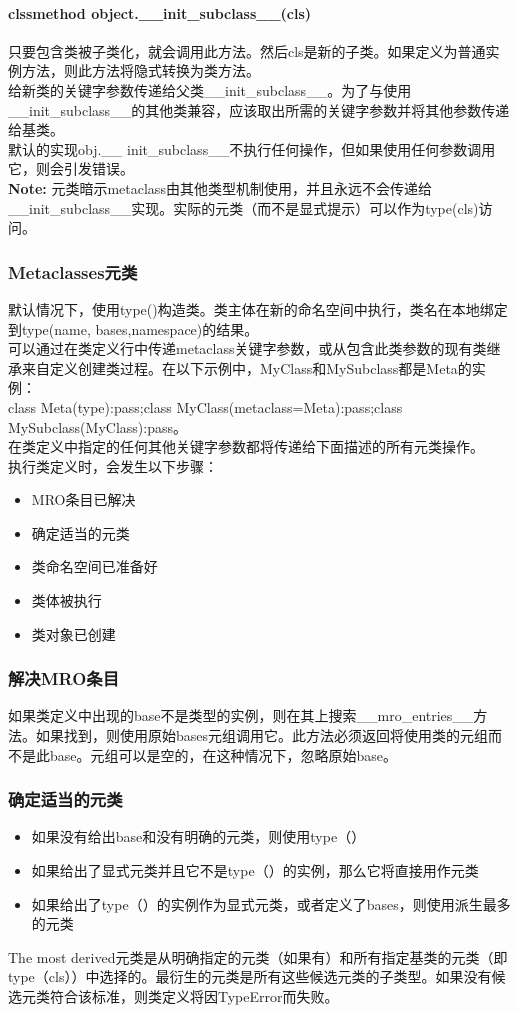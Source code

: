 \documentclass[10pt,UTF8]{ctexart}
\begin{document}
\begin{flushleft}
\paragraph{clssmethod object.__init_subclass__(cls)}只要包含类被子类化，就会调用此方法。然后cls是新的子类。如果定义为普通实例方法，则此方法将隐式转换为类方法。\\
\indent 给新类的关键字参数传递给父类__init_subclass__。为了与使用__init_subclass__的其他类兼容，应该取出所需的关键字参数并将其他参数传递给基类。\\
\indent 默认的实现obj.__ init_subclass__不执行任何操作，但如果使用任何参数调用它，则会引发错误。\\
\textbf{Note:} 元类暗示metaclass由其他类型机制使用，并且永远不会传递给__init_subclass__实现。实际的元类（而不是显式提示）可以作为type(cls)访问。

\subsubsection{Metaclasses元类}
默认情况下，使用type()构造类。类主体在新的命名空间中执行，类名在本地绑定到type(name, bases,namespace)的结果。\\
\indent 可以通过在类定义行中传递metaclass关键字参数，或从包含此类参数的现有类继承来自定义创建类过程。在以下示例中，MyClass和MySubclass都是Meta的实例：\\
\indent class Meta(type):pass;class MyClass(metaclass=Meta):pass;class MySubclass(MyClass):pass。\\
\indent 在类定义中指定的任何其他关键字参数都将传递给下面描述的所有元类操作。\\
\indent 执行类定义时，会发生以下步骤：
\begin{itemize}
\item MRO条目已解决
\item 确定适当的元类
\item 类命名空间已准备好
\item 类体被执行
\item 类对象已创建
\end{itemize}
\subsubsection{解决MRO条目}
如果类定义中出现的base不是类型的实例，则在其上搜索__mro_entries__方法。如果找到，则使用原始bases元组调用它。此方法必须返回将使用类的元组而不是此base。元组可以是空的，在这种情况下，忽略原始base。
\subsubsection{确定适当的元类}
\begin{itemize}
\item 如果没有给出base和没有明确的元类，则使用type（）
\item 如果给出了显式元类并且它不是type（）的实例，那么它将直接用作元类
\item 如果给出了type（）的实例作为显式元类，或者定义了bases，则使用派生最多的元类
\end{itemize}
The most derived元类是从明确指定的元类（如果有）和所有指定基类的元类（即type（cls））中选择的。最衍生的元类是所有这些候选元类的子类型。如果没有候选元类符合该标准，则类定义将因TypeError而失败。

\end{flushleft}
\end{document}
